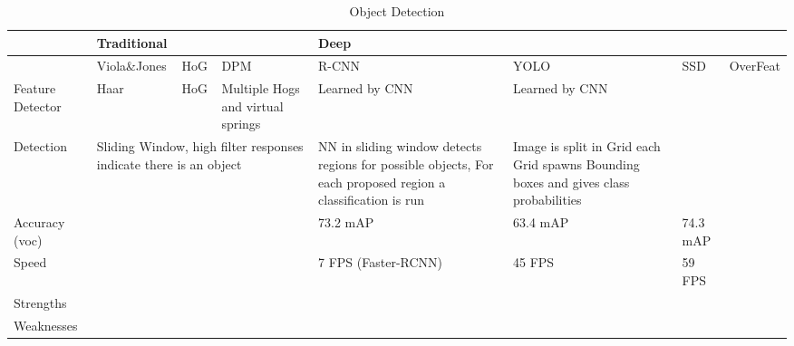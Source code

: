 \begin{table}[]
	
	\caption{Object Detection}
	\label{my-label}
	\begin{tabular}{|p{3cm}|p{3cm}|p{3cm}|p{3cm}|p{3cm}|p{3cm}|p{3cm}|p{3cm}|}
		\hline
		& \multicolumn{3}{l|}{Traditional} & \multicolumn{4}{l|}{Deep}   \\ \hline
		& Viola\&Jones    				   & HoG    & DPM   		   & R-CNN    & YOLO         & SSD & OverFeat \\ \hline
		Feature Detector & Haar					   & HoG    & Multiple Hogs and virtual springs   & Learned by CNN     &  Learned by CNN            & & \\ \hline
		Detection & \multicolumn{3}{l|}{Sliding Window, high filter responses indicate there is an object} & NN in sliding window detects regions for possible objects, For each proposed region a classification is run & Image is split in Grid each Grid spawns Bounding boxes and gives class probabilities & & \\
		\hline
		Accuracy (voc) &  & & & 73.2 mAP & 63.4 mAP & 74.3 mAP & \\ 
		\hline
		Speed & & & & 7 FPS (Faster-RCNN) & 45 FPS & 59 FPS & \\
		\hline
		Strengths & & & & & &  &\\
		\hline
		Weaknesses & & & & & &  &\\
		\hline
		\end{tabular}
		
		\end{table}


